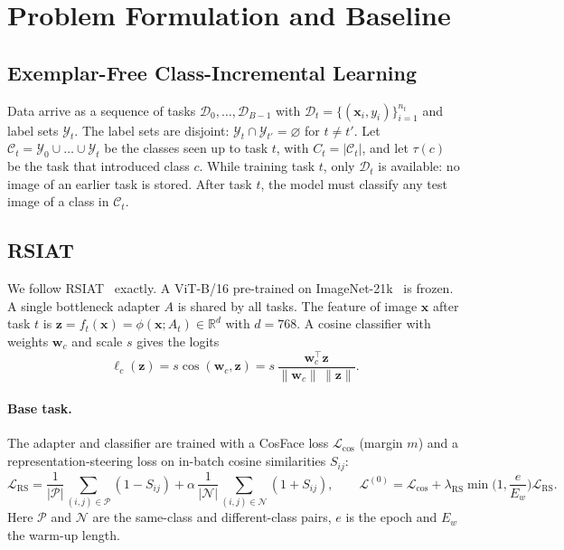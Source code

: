 \section{Problem Formulation and Baseline}
\label{sec:background}

\subsection{Exemplar-Free Class-Incremental Learning}
Data arrive as a sequence of tasks $\mathcal D_0,\dots,\mathcal D_{B-1}$ with
$\mathcal D_t=\{(\mathbf x_i,y_i)\}_{i=1}^{n_t}$ and label sets $\mathcal Y_t$. The
label sets are disjoint: $\mathcal Y_t\cap\mathcal Y_{t'}=\varnothing$ for
$t\ne t'$. Let $\mathcal C_t=\mathcal Y_0\cup\dots\cup\mathcal Y_t$ be the classes
seen up to task $t$, with $C_t=|\mathcal C_t|$, and let $\tau(c)$ be the task
that introduced class $c$. While training task $t$, only $\mathcal D_t$ is
available: no image of an earlier task is stored. After task $t$, the model
must classify any test image of a class in $\mathcal C_t$.

\subsection{RSIAT}
We follow RSIAT~\cite{rsiat} exactly. A ViT-B/16 pre-trained on
ImageNet-21k~\cite{dosovitskiy2021vit} is frozen. A single bottleneck adapter
$A$ is shared by all tasks. The feature of image $\mathbf x$ after task $t$ is
$\mathbf z=f_t(\mathbf x)=\phi(\mathbf x;A_t)\in\mathbb R^{d}$ with $d=768$. A
cosine classifier with weights $\mathbf w_c$ and scale $s$ gives the logits
\begin{equation}
  \ell_c(\mathbf z)=s\cos(\mathbf w_c,\mathbf z)=s\,\frac{\mathbf w_c^{\top}\mathbf z}{\|\mathbf w_c\|\,\|\mathbf z\|}.
  \label{eq:logits}
\end{equation}

\paragraph{Base task.}
The adapter and classifier are trained with a CosFace loss
$\mathcal L_{\cos}$ (margin $m$) and a representation-steering loss on
in-batch cosine similarities $S_{ij}$:
\begin{equation}
  \mathcal L_{\mathrm{RS}}=\frac1{|\mathcal P|}\sum_{(i,j)\in\mathcal P}(1-S_{ij})
  +\alpha\,\frac1{|\mathcal N|}\sum_{(i,j)\in\mathcal N}(1+S_{ij}),\qquad
  \mathcal L^{(0)}=\mathcal L_{\cos}+\lambda_{\mathrm{RS}}\min\!\Big(1,\frac{e}{E_w}\Big)\mathcal L_{\mathrm{RS}}.
  \label{eq:rs}
\end{equation}
Here $\mathcal P$ and $\mathcal N$ are the same-class and different-class
pairs, $e$ is the epoch and $E_w$ the warm-up length.

